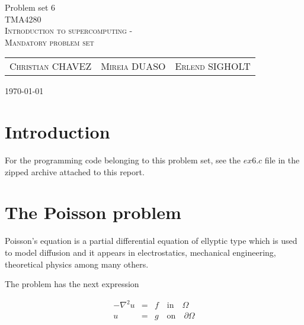 \documentclass[fontsize=11pt,paper=a4,titlepage]{report}
\begin{document}
\begin{center}


{\huge Problem set 6}\\[0.5cm]

\textsc{\LARGE TMA4280}\\[0.5cm]
\textsc{\large Introduction to supercomputing -}\\
\textsc{\large Mandatory problem set}\\[0.6cm]

\begin{table}[h]
\centering
\begin{tabular}{ccc}
	\textsc{Christian CHAVEZ} & \textsc{Mireia DUASO} & \textsc{Erlend SIGHOLT}
\end{tabular}
\end{table}

\large{\today}
\vfill
\end{center}


\addtocounter{chapter}{1}

\clearpage
\section{Introduction}

For the programming code belonging to this problem set, see the $\textit{ex6.c}$
file in the zipped archive attached to this report. 


\section{The Poisson problem}

Poisson's equation is a partial differential equation of ellyptic type which is 
used to model diffusion and it appears in electrostatics, mechanical engineering,
theoretical physics among many others.

The problem has the next expression

\begin{eqnarray}
	-\nabla^2 u & = & f \quad \textrm{in} \quad \Omega \\
	u & = & g \quad \textrm{on} \quad \partial\Omega
	\label{eq:Poisson}
\end{eqnarray}
\end{document}
